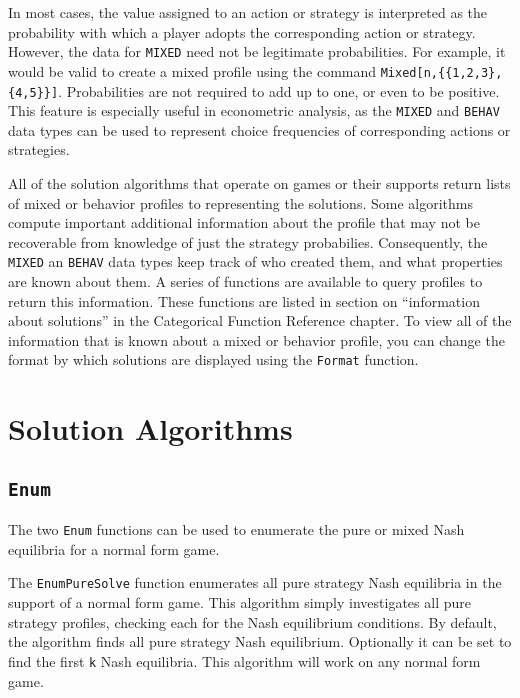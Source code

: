 In most cases, the value assigned to an action or strategy is
interpreted as the probability with which a player adopts the
corresponding action or strategy.  However, the data for \verb+MIXED+
need not be legitimate probabilities.  For example, it would be valid
to create a mixed profile using the command
\verb+Mixed[n,{{1,2,3},{4,5}}]+.  Probabilities are not
required to add up to one, or even to be positive.  This feature is
especially useful in econometric analysis, as the \verb+MIXED+ and
\verb+BEHAV+ data types can be used to represent choice frequencies of
corresponding actions or strategies.  

All of the solution algorithms that operate on games or their supports
return lists of mixed or behavior profiles to representing the
solutions.  Some algorithms compute important additional information
about the profile that may not be recoverable from knowledge of just
the strategy probabilies.  Consequently, the \verb+MIXED+ an
\verb+BEHAV+ data types keep track of who created them, and what
properties are known about them.  A series of functions are available
to query profiles to return this information.  These functions are
listed in section on ``information about solutions'' in the
Categorical Function Reference chapter.  To view all of the
information that is known about a mixed or behavior profile, you can
change the format by which solutions are displayed using the
\texttt{Format} function.

\section{Solution Algorithms}

\subsection{\texttt{Enum}}

The two \texttt{Enum} functions can be used to enumerate the pure or
mixed Nash equilibria for a normal form game.

The \texttt{EnumPureSolve} function enumerates all pure strategy Nash
equilibria in the support of a normal form game.  This algorithm
simply investigates all pure strategy profiles, checking each for the
Nash equilibrium conditions.  By default, the algorithm finds all pure
strategy Nash equilibrium.  Optionally it can be set to find the first
\verb+k+ Nash equilibria.  This algorithm will work on any normal form
game.


